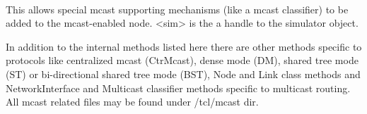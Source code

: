 \begin{flushleft}
\\
This allows special mcast supporting mechanisms (like a mcast classifier) to
be added to the mcast-enabled node. <sim> is the a handle to the simulator
object.


In addition to the internal methods listed here there are other methods specific to
protocols like centralized mcast (CtrMcast), dense mode (DM), shared tree
mode (ST) or bi-directional shared tree mode (BST), Node and Link class
methods and NetworkInterface and Multicast classifier methods specific to
multicast routing. All mcast related files may be found under \ns/tcl/mcast dir.

\end{flushleft}

\endinput
